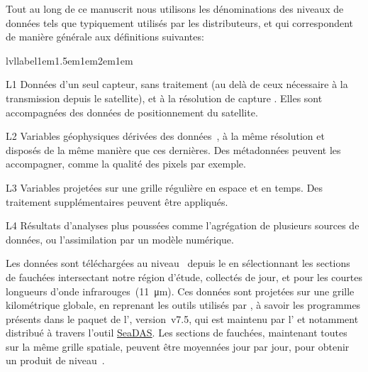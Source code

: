 \begin{note}[label={note:data-levels}, breakable]
  Tout au long de ce manuscrit nous utilisons les dénominations des niveaux de données tels que typiquement utilisés par les distributeurs, et qui correspondent de manière générale aux définitions suivantes:
  \newcommand*\lvllabel[1]{\hspace\labelsep \normalfont\bfseries\lfstyle #1}%
  \begin{flexlabelled}{lvllabel}{1em}{1.5em}{1em}{2em}{1em}
    \item[L1] Données d'un seul capteur, sans traitement (au delà de ceux nécessaire à la transmission depuis le satellite), et à la résolution de capture .
    Elles sont accompagnées des données de positionnement du satellite.

    \item[L2] Variables géophysiques dérivées des données~, à la même résolution et disposés de la même manière que ces dernières.
    Des métadonnées peuvent les accompagner, comme la qualité des pixels par exemple.

    \item[L3] Variables projetées sur une grille régulière en espace et en temps.
    Des traitement supplémentaires peuvent être appliqués.

    \item[L4] Résultats d'analyses plus poussées comme l’agrégation de plusieurs sources de données, ou l'assimilation par un modèle numérique.
  \end{flexlabelled}
\end{note}

Les données sont téléchargées au niveau~ depuis le  en sélectionnant les sections de fauchées\footnotemark{} intersectant notre région d'étude, collectés de jour, et pour les courtes longueurs d'onde infrarouges~(\qty{11}{\um}).
Ces données sont projetées sur une grille kilométrique globale, en reprenant les outils utilisés par \citeauthor{liu_2016}, à savoir les programmes présents dans le paquet de l'\href{https://oceandata.sci.gsfc.nasa.gov/ocssw}{}, version~v7.5, qui est maintenu par l' et notamment distribué à travers l'outil \href{https://seadas.gsfc.nasa.gov/}{SeaDAS}.
Les sections de fauchées, maintenant toutes sur la même grille spatiale, peuvent être moyennées jour par jour, pour obtenir un produit de niveau~.

